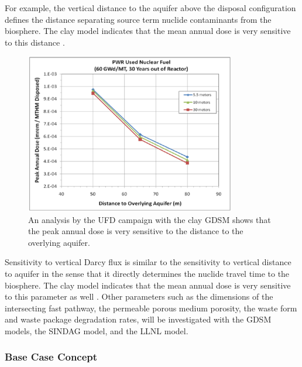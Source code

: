 For example, the vertical distance to the aquifer above the disposal configuration
defines the distance separating source term nuclide contaminants from the biosphere. 
The clay model indicates that the mean annual dose is very sensitive to this 
distance \cite{clayton_generic_2011}.

\begin{figure}[h!]
  \begin{center}
    \includegraphics[height=7cm]{./chapters/future/overlyingDist.eps}
  \end{center}
  \caption[Distance to Aquifer Peak Dose Sensitivity]{An analysis by the UFD campaign with the clay GDSM shows that 
  the peak annual dose is very sensitive to the distance to the overlying 
  aquifer\cite{clayton_generic_2011}.}
  \label{fig:overlyingDist}
\end{figure}
\clearpage

Sensitivity to vertical Darcy flux is similar to the sensitivity to vertical 
distance to aquifer in the sense that it directly determines the nuclide travel 
time to the biosphere. The clay model indicates that the mean annual dose is 
very sensitive to this parameter as well \cite{clayton_generic_2011}. Other 
parameters such as the dimensions of the intersecting fast pathway, the 
permeable porous medium porosity, the waste form and waste package degradation 
rates, will be investigated with the \gls{GDSM} models, the \gls{SINDAG} model, 
and the \gls{LLNL} model. 

\subsubsection{Base Case Concept}



